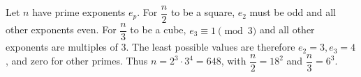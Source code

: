 Let $n$ have prime exponents $e_p$. For $\dfrac{n}{2}$ to be a square, $e_2$ must be odd and all other exponents even. For $\dfrac{n}{3}$ to be a cube, $e_3\equiv1\pmod3$ and all other exponents are multiples of 3. The least possible values are therefore $e_2=3,e_3=4$, and zero for other primes. Thus $n=2^3\cdot3^4=\boxed{648}$, with $\dfrac{n}{2}=18^2$ and $\dfrac{n}{3}=6^3$.
